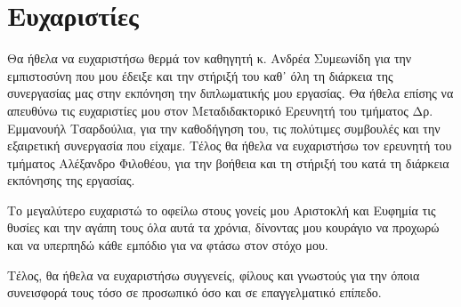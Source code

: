 \section*{Ευχαριστίες}
{}


Θα ήθελα να ευχαριστήσω θερμά τον καθηγητή κ. Ανδρέα Συμεωνίδη
για την εμπιστοσύνη που μου έδειξε και την στήριξή του καθ᾽ όλη τη
διάρκεια της συνεργασίας μας στην εκπόνηση την διπλωματικής
μου εργασίας. Θα ήθελα επίσης να απευθύνω τις ευχαριστίες μου στον Μεταδιδακτορικό Ερευνητή του τμήματος Δρ. Εμμανουήλ Τσαρδούλια, για την καθοδήγηση του, τις πολύτιμες συμβουλές και την εξαιρετική συνεργασία που είχαμε. Τέλος θα ήθελα να ευχαριστήσω τον ερευνητή του τμήματος Αλέξανδρο Φιλοθέου, για την βοήθεια και τη στήριξή του κατά τη διάρκεια εκπόνησης της εργασίας.

Το μεγαλύτερο ευχαριστώ το οφείλω στους γονείς μου Αριστοκλή και Ευφημία τις θυσίες και την αγάπη τους όλα αυτά τα χρόνια, δίνοντας μου κουράγιο να προχωρώ και να υπερπηδώ κάθε εμπόδιο για να φτάσω στον στόχο μου.

Τέλος, θα ήθελα να ευχαριστήσω συγγενείς, φίλους και γνωστούς για την όποια συνεισφορά τους τόσο σε προσωπικό όσο και σε επαγγελματικό επίπεδο.